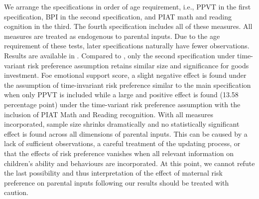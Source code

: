 \documentclass[emulatestandardclasses, 10pt, abstract = true]{scrartcl}
\begin{document}
We arrange the specifications in order of age requirement, i.e., PPVT in the first specification, BPI in the second specification, and PIAT math and reading cognition in the third. The fourth specification includes all of these measures. All measures are treated as endogenous to parental inputs. Due to the age requirement of these tests, later specifications naturally have fewer observations. Results are available in . Compared to , only the second specification under time-variant risk preference assumption retains similar size and significance for goods investment. Foe emotional support score, a slight negative effect is found under the assumption of time-invariant risk preference similar to the main specification when only PPVT is included while a large and positive effect is found (13.58 percentage point) under the time-variant risk preference assumption with the inclusion of PIAT Math and Reading recognition. With all measures incorporated, sample size shrinks dramatically and no statistically significant effect is found across all dimensions of parental inputs. This can be caused by a lack of sufficient observations, a careful treatment of the updating process, or that the effects of risk preference vanishes when all relevant information on children's ability and behaviours are incorporated. At this point, we cannot refute the last possibility and thus interpretation of the effect of maternal risk preference on parental inputs following our results should be treated with caution.





\end{document}
